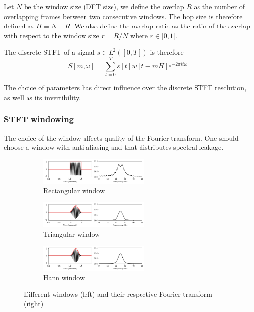 \documentclass[american,]{article}
\theoremstyle{definition}
\theoremstyle{definition}
\theoremstyle{definition}
\theoremstyle{remark}
\begin{document}
Let \(N\) be the window size (DFT size), we define the overlap \(R\)
as the number of overlapping frames between two consecutive windows.
The hop size is therefore defined as \(H=N-R\).
We also define the overlap ratio as the ratio of the overlap
with respect to the window size \(r=R/N\) where \(r\in[0,1[\).

The discrete STFT of a signal \(s\in L^2([0,T])\) is therefore
\begin{equation}
S[m,\omega] = \sum_{t=0}^{T} s[t]w[t-mH]e^{-2\pi it\omega}
\end{equation}

The choice of parameters has direct influence over the discrete STFT
resolution, as well as its invertibility.

\hypertarget{stft-windowing}{%
\subsubsection{STFT windowing}\label{stft-windowing}}

The choice of the window affects quality of the Fourier transform.
One should choose a window with anti-aliasing and that distributes
spectral leakage.

\begin{figure}[H]
    \centering
    \begin{subfigure}[t]{\textwidth}
        \centering
        \includegraphics[width=0.6\textwidth]{img/w_rectangle.png}
        \caption{Rectangular window}
    \end{subfigure}
    \begin{subfigure}[t]{\textwidth}
        \centering
        \includegraphics[width=0.6\textwidth]{img/w_triangle.png}
        \caption{Triangular window}
    \end{subfigure}
    \begin{subfigure}[t]{\textwidth}
        \centering
        \includegraphics[width=0.6\textwidth]{img/w_hann.png}
        \caption{Hann window}
    \end{subfigure}
    \caption{Different windows (left) and their respective Fourier transform (right)}
\end{figure}
\end{document}
